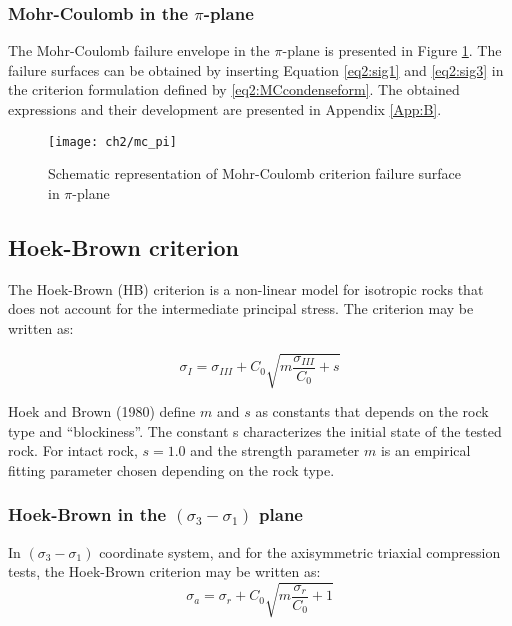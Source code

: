 \subsubsection{Mohr-Coulomb in the \texorpdfstring{$\pi$}{pi}-plane}\label{ch2:MC_pi}

The Mohr-Coulomb failure envelope in the $\pi$-plane is presented in Figure \ref{fig2:mc_pi}. The failure surfaces can be obtained by inserting Equation \ref{eq2:sig1} and \ref{eq2:sig3} in the criterion formulation defined by \ref{eq2:MCcondenseform}. The obtained expressions and their development are presented in Appendix \ref{App:B}. 

\begin{figure}[tb]
    \centering
    \texttt{[image: ch2/mc\_pi]}
    \caption{Schematic representation of Mohr-Coulomb criterion failure surface in  $\pi$-plane}
    \label{fig2:mc_pi}
\end{figure} 

\subsection{Hoek-Brown criterion}

The Hoek-Brown (HB) criterion is a non-linear model for isotropic rocks that does not account for the intermediate principal stress. The criterion may be written as:

\begin{equation}\label{eq2:HB-crit}
    \sigma_{I}=\sigma_{III}+C_{0} \sqrt{m \frac{\sigma_{III}}{C_{0}}+s}
\end{equation}

Hoek and Brown (1980) \cite{Hoek1980} define $m$ and $s$  as constants that depends on the rock type and “blockiness”. The constant s characterizes the initial state of the tested rock. For intact rock, $s=1.0$ and the strength parameter $m$ is an empirical fitting parameter chosen depending on the rock type.  

\subsubsection{Hoek-Brown in the \texorpdfstring{$(\sigma_3 -\sigma_1)$}{sigma 3 - sigma 1} plane}

In $(\sigma_3 -\sigma_1)$ coordinate system, and for the axisymmetric triaxial compression tests, the Hoek-Brown criterion may be written as:
\begin{equation}\label{eq2:HBsig1_CTC}
    \sigma_{a}=\sigma_{r}+C_{0} \sqrt{m \frac{\sigma_{r}}{C_{0}}+1}
\end{equation}


